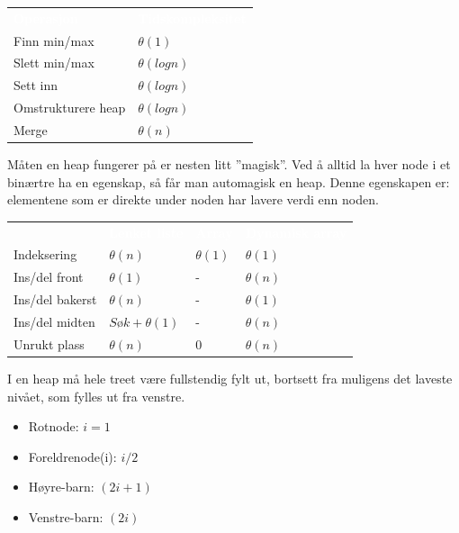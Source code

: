 \begin{table}[H]
    \label{tab:datastrukturer}
    \centering
    \begin{tabular}{|L{15em} | L{15em}|}
        \hline
        \textbf{\textcolor{white}{Operasjon}} & \textbf{\textcolor{white}{ Tidskompleksitet}}\\
        Finn min/max & $\theta(1)$\\
        Slett min/max & $\theta(log n)$\\
        Sett inn & $\theta(log n)$\\
        Omstrukturere heap & $\theta(log n)$\\
        Merge & $\theta(n)$\\
         \hline
    \end{tabular}
\end{table}

\noindent Måten en heap fungerer på er nesten litt ”magisk”. Ved å alltid la hver node i et binærtre ha en egenskap, så får man automagisk en heap. Denne egenskapen er: elementene som er direkte under noden har lavere verdi enn noden.

\begin{table}[H]
    \label{tab:heap}
    \centering
    \begin{tabular}{|L{10em} | L{10em}| L{10em}|L{10em}|}
        \hline
        \textbf{\textcolor{white}{}} & \textbf{\textcolor{white}{Lenket liste}} & \textbf{\textcolor{white}{Array}} & \textbf{\textcolor{white}{Dynamisk array}}\\
        Indeksering & $\theta(n)$ & $\theta(1)$ & $\theta(1)$\\
        Ins/del front & $\theta(1)$ & - & $\theta(n)$\\
        Ins/del bakerst & $\theta(n)$ & - & $\theta(1)$\\
        Ins/del midten & $Søk + \theta(1)$ & - & $\theta(n)$\\
        Unrukt plass & $\theta(n)$ & 0 & $\theta(n)$\\
         \hline
    \end{tabular}
\end{table}

\noindent I en heap må hele treet være fullstendig fylt ut, bortsett fra muligens det laveste nivået, som fylles ut fra venstre.
\begin{itemize}
    \item Rotnode: $i = 1$
    \item Foreldrenode(i): $i/2$
    \item Høyre-barn: $(2i + 1)$
    \item Venstre-barn: $(2i)$
\end{itemize}

